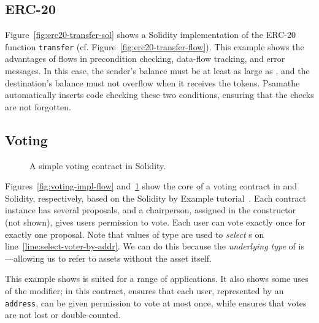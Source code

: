 \documentclass[dvipsnames, sigplan, screen]{acmart}
\begin{document}
\subsection{ERC-20}\label{sec:erc20-impl}
Figure~\ref{fig:erc20-transfer-sol} shows a Solidity implementation of the ERC-20 function \lstinline{transfer} (cf. Figure~\ref{fig:erc20-transfer-flow}).
This example shows the advantages of flows in precondition checking, data-flow tracking, and error messages.
In this case, the sender's balance must be at least as large as , and the destination's balance must not overflow when it receives the tokens.
Psamathe automatically inserts code checking these two conditions, ensuring that the checks are not forgotten.

\subsection{Voting}\label{sec:voting-impl}
\begin{figure}[!b]
    \centering
    
    \vspace{-1em}
    \caption{A simple voting contract in Solidity.}
    \label{fig:voting-impl-sol}
\end{figure}
Figures~\ref{fig:voting-impl-flow} and~\ref{fig:voting-impl-sol} show the core of a voting contract in \langName and Solidity, respectively, based on the Solidity by Example tutorial~\cite{solidityByExample}.
Each contract instance has several proposals, and a chairperson, assigned in the constructor (not shown), gives users permission to vote.
Each user can vote exactly once for exactly one proposal. %
Note that values of type  are used to \emph{select} s on line~\ref{line:select-voter-by-addr}.
We can do this because the \emph{underlying type} of  is ---allowing us to refer to assets without the asset itself.

This example shows \langName is suited for a range of applications.
It also shows some uses of the  modifier; in this contract,  ensures that each user, represented by an \lstinline{address}, can be given permission to vote at most once, while  ensures that votes are not lost or double-counted.
\end{document}
